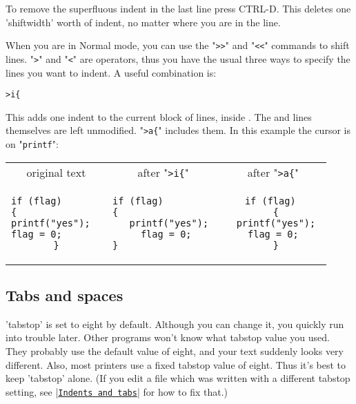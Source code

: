 To remove the superfluous indent in the last line press CTRL-D.
This deletes one 'shiftwidth' worth of indent, no matter where you are in the line.

When you are in Normal mode, you can use the "\verb!>>!" and "\verb!<<!" commands to shift lines.
"\verb!>!" and "\verb!<!" are operators, thus you have the usual three ways to specify the lines you want to indent.
A useful combination is:

\begin{Verbatim}[samepage=true]
 >i{
\end{Verbatim}

This adds one indent to the current block of lines, inside {}.
The { and } lines themselves are left unmodified.
"\verb!>a{!" includes them.
In this example the cursor is on "\verb!printf!":

\begin{center} \begin{tabular}{|c|c|c|}
				\hline
				original text & after "\verb!>i{!" & after "\verb!>a{!" \\ 
				\begin{minipage}{4cm}
				\begin{verbatim}
if (flag)       
{               
printf("yes");  
flag = 0;       
}
				\end{verbatim}
				\end{minipage}
& 
				\begin{minipage}{4cm}
				\begin{verbatim}
if (flag)         
{                 
  printf("yes");
  flag = 0; 
}                 
				\end{verbatim}
				\end{minipage}
&
				\begin{minipage}{4cm}
				\begin{verbatim}
if (flag) 
  { 
  printf("yes"); 
  flag = 0;  
  } 
				\end{verbatim}
				\end{minipage} \\
				\hline
\end{tabular} \end{center}
\subsection{Tabs and spaces}
'tabstop' is set to eight by default.
Although you can change it, you quickly run into trouble later.
Other programs won't know what tabstop value you used.
They probably use the default value of eight, and your text suddenly looks very different.
Also, most printers use a fixed tabstop value of eight.
Thus it's best to keep 'tabstop' alone.
(If you edit a file which was written with a different tabstop setting, see |\hyperref[Indents and tabs]{\texttt{Indents and tabs}}| for how to fix that.)

